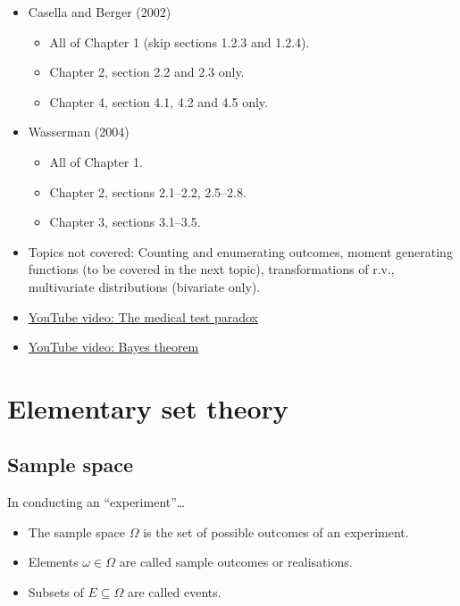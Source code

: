 \documentclass[
]{book}
\providecommand{\tightlist}{%
  \setlength{\itemsep}{0pt}\setlength{\parskip}{0pt}}
\theoremstyle{definition}
\theoremstyle{definition}
\theoremstyle{definition}
\theoremstyle{definition}
\theoremstyle{remark}
\begin{document}
\begin{itemize}
\tightlist
\item
  Casella and Berger (2002)

  \begin{itemize}
  \tightlist
  \item
    All of Chapter 1 (skip sections 1.2.3 and 1.2.4).
  \item
    Chapter 2, section 2.2 and 2.3 only.
  \item
    Chapter 4, section 4.1, 4.2 and 4.5 only.
  \end{itemize}
\item
  Wasserman (2004)

  \begin{itemize}
  \tightlist
  \item
    All of Chapter 1.
  \item
    Chapter 2, sections 2.1--2.2, 2.5--2.8.
  \item
    Chapter 3, sections 3.1--3.5.
  \end{itemize}
\item
  Topics not covered: Counting and enumerating outcomes, moment generating functions (to be covered in the next topic), transformations of r.v., multivariate distributions (bivariate only).
\item
  \href{https://www.youtube.com/watch?v=lG4VkPoG3ko}{YouTube video: The medical test paradox}
\item
  \href{https://www.youtube.com/watch?v=HZGCoVF3YvM}{YouTube video: Bayes theorem}
\end{itemize}

\hypertarget{elementary-set-theory}{%
\section{Elementary set theory}\label{elementary-set-theory}}

\hypertarget{sample-space}{%
\subsection{Sample space}\label{sample-space}}

In conducting an ``experiment''\ldots{}

\begin{itemize}
\tightlist
\item
  The sample space \(\Omega\) is the set of possible outcomes of an experiment.
\item
  Elements \(\omega \in \Omega\) are called sample outcomes or realisations.
\item
  Subsets of \(E \subseteq \Omega\) are called events.
\end{itemize}
\end{document}

